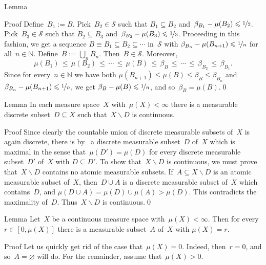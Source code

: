 \documentclass[a]{subfiles}
\begin{document}
\begin{parsec}
\begin{point}{Lemma}
\begin{point}{Proof}
Define~$B_1:= B$.
Pick~$B_2\in\mathcal{S}$
such that $B_1 \subseteq B_2$
and~$\beta_{B_1}-\mu(B_2)\leq \nicefrac{1}{2}$.
Pick~$B_3\in\mathcal{S}$
such that $B_2\subseteq B_3$
and~$\beta_{B_2}-\mu(B_3) \leq \nicefrac{1}{3}$.
Proceeding in this fashion,
we get a sequence $B\equiv B_1\subseteq B_2 \subseteq \dotsb$
in~$\mathcal{S}$
with $\beta_{B_{n}}-\mu(B_{n+1})\leq \nicefrac{1}{n}$
for all~$n\in\mathbb{N}$.
Define~$B:=\bigcup_n B_n$.
Then~$B\in \mathcal{S}$.
Moreover,
\begin{equation*}
\mu(B_1)\,\leq\, \mu(B_2)\,\leq\,
\dotsb \,\leq\,\mu(B)\,\leq\, \beta_B \,\leq\, \dotsb
\,\leq\, \beta_{B_2}\,\leq\, \beta_{B_1}.
\end{equation*}
Since for every~$n\in\mathbb{N}$
we have both $\mu(B_{n+1})\leq \mu(B)\leq \beta_B \leq \beta_{B_n}$
and $\beta_{B_n}- \mu(B_{n+1}) \leq \nicefrac{1}{n}$,
we get $\beta_B-\mu(B)\leq \nicefrac{1}{n}$,
and so~$\beta_B = \mu(B)$.\qed
\end{point}
\end{point}

\begin{point}{Lemma}%
In each measure space~$X$ with~$\mu(X)<\infty$
there is a measurable discrete subset~$D\subseteq X$
such that~$X\backslash D$ is continuous.
\begin{point}{Proof}%
Since clearly the countable union
of discrete measurable subsets of~$X$
is again discrete,
there is by~
a discrete measurable subset~$D$ of~$X$
which is maximal in the sense that~$\mu(D')=\mu(D)$
for every discrete measurable subset~$D'$ of~$X$ with $D\subseteq D'$.
To show that~$X\backslash D$ is continuous,
we must prove that~$X\backslash D$
contains no atomic measurable subsets.
If~$A\subseteq X\backslash D$ is an atomic measurable subset
of~$X$,
then~$D\cup A$
is a discrete measurable
subset of~$X$
which contains~$D$,
and $\mu(D\cup A)=\mu(D)\cup \mu(A) > \mu(D)$.
This contradicts the  maximality of~$D$.
Thus~$X\backslash D$ is continuous.\qed
\end{point}
\end{point}
\begin{point}{Lemma}%
Let~$X$ be a continuous measure space
with~$\mu(X)<\infty$.
Then for every~$r\in [0,\mu(X)]$
there is a measurable subset~$A$ of~$X$ with $\mu(X)=r$.
\begin{point}{Proof}%
Let us quickly get rid of the case that~$\mu(X)=0$.
Indeed, then~$r=0$, and so~$A=\varnothing$ will do.
For the remainder, assume that~$\mu(X)>0$.


\end{point}
\end{point}
\end{parsec}
\end{document}
